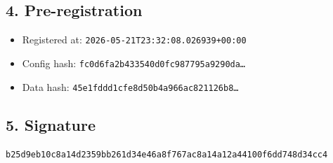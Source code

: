 \documentclass{article}
\begin{document}
\subsection*{4. Pre-registration}
\begin{itemize}
\item Registered at: \texttt{2026-05-21T23:32:08.026939+00:00}
\item Config hash: \texttt{fc0d6fa2b433540d0fc987795a9290da\dots}
\item Data hash: \texttt{45e1fddd1cfe8d50b4a966ac821126b8\dots}
\end{itemize}
\subsection*{5. Signature}
\texttt{b25d9eb10c8a14d2359bb261d34e46a8f767ac8a14a12a44100f6dd748d34cc4}\\
\end{document}
